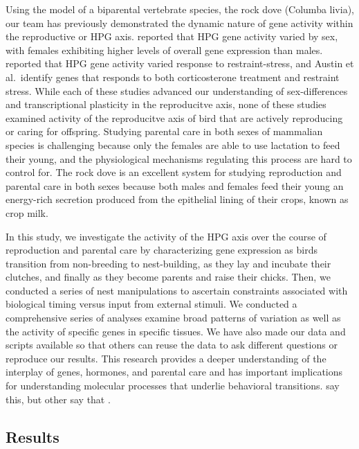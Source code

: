 Using the model of a biparental vertebrate species, the rock dove
(Columba livia), our team has previously demonstrated the dynamic nature
of gene activity within the reproductive or HPG axis.
\citet{MacManes2017} reported that HPG gene activity varied by sex, with
females exhibiting higher levels of overall gene expression than males.
\citet{Calisi2018} reported that HPG gene activity varied response to
restraint-stress, and Austin et al.~identify genes that responds to both
corticosterone treatment and restraint stress. While each of these
studies advanced our understanding of sex-differences and
transcriptional plasticity in the reproducitve axis, none of these
studies examined activity of the reproducitve axis of bird that are
actively reproducing or caring for offspring. Studying parental care in
both sexes of mammalian species is challenging because only the females
are able to use lactation to feed their young, and the physiological
mechanisms regulating this process are hard to control for. The rock
dove is an excellent system for studying reproduction and parental care
in both sexes because both males and females feed their young an
energy-rich secretion produced from the epithelial lining of their
crops, known as crop milk.

In this study, we investigate the activity of the HPG axis over the
course of reproduction and parental care by characterizing gene
expression as birds transition from non-breeding to nest-building, as
they lay and incubate their clutches, and finally as they become parents
and raise their chicks. Then, we conducted a series of nest
manipulations to ascertain constraints associated with biological timing
versus input from external stimuli. We conducted a comprehensive series
of analyses examine broad patterns of variation as well as the activity
of specific genes in specific tissues. We have also made our data and
scripts available so that others can reuse the data to ask different
questions or reproduce our results. This research provides a deeper
understanding of the interplay of genes, hormones, and parental care and
has important implications for understanding molecular processes that
underlie behavioral transitions. \citep[reviewed in][]{Lea1989} say
this, but other say that \citep[reviewed in][]{Dulac2014}.

\hypertarget{results}{%
\subsection{Results}\label{results}}

